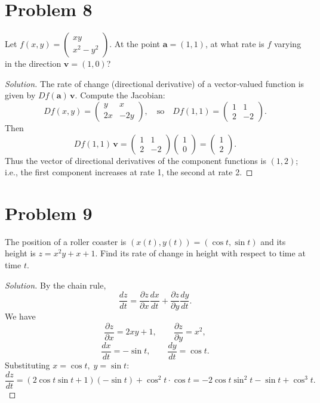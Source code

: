\documentclass{article}
\begin{document}
\section*{Problem 8}
Let \(f(x,y)=\begin{pmatrix} xy \\ x^2-y^2 \end{pmatrix}\). At the point \(\mathbf{a}=(1,1)\), at what rate is \(f\) varying in the direction \(\mathbf{v}=(1,0)\)?

\begin{proof}[Solution]
	The rate of change (directional derivative) of a vector‑valued function is given by \(Df(\mathbf{a})\,\mathbf{v}\). Compute the Jacobian:
	\[
		Df(x,y)=\begin{pmatrix}
			y  & x   \\
			2x & -2y
		\end{pmatrix},\quad\text{so}\quad Df(1,1)=\begin{pmatrix}
			1 & 1  \\
			2 & -2
		\end{pmatrix}.
	\]
	Then
	\[
		Df(1,1)\,\mathbf{v}=\begin{pmatrix}
			1 & 1  \\
			2 & -2
		\end{pmatrix}\begin{pmatrix}1\\0\end{pmatrix}=\begin{pmatrix}1\\2\end{pmatrix}.
	\]
	Thus the vector of directional derivatives of the component functions is \((1,2)\); i.e., the first component increases at rate 1, the second at rate 2.
\end{proof}

\section*{Problem 9}
The position of a roller coaster is \((x(t),y(t))=(\cos t,\sin t)\) and its height is \(z=x^2y+x+1\). Find its rate of change in height with respect to time at time \(t\).

\begin{proof}[Solution]
	By the chain rule,
	\[
		\frac{dz}{dt}=\frac{\partial z}{\partial x}\frac{dx}{dt}+\frac{\partial z}{\partial y}\frac{dy}{dt}.
	\]
	We have
	\[
		\frac{\partial z}{\partial x}=2xy+1,\qquad \frac{\partial z}{\partial y}=x^2,
	\]
	\[
		\frac{dx}{dt}=-\sin t,\qquad \frac{dy}{dt}=\cos t.
	\]
	Substituting \(x=\cos t,\;y=\sin t\):
	\[
		\frac{dz}{dt}=(2\cos t\sin t+1)(-\sin t)+\cos^2 t\cdot\cos t
		=-2\cos t\sin^2 t-\sin t+\cos^3 t.
	\]
\end{proof}
\end{document}
